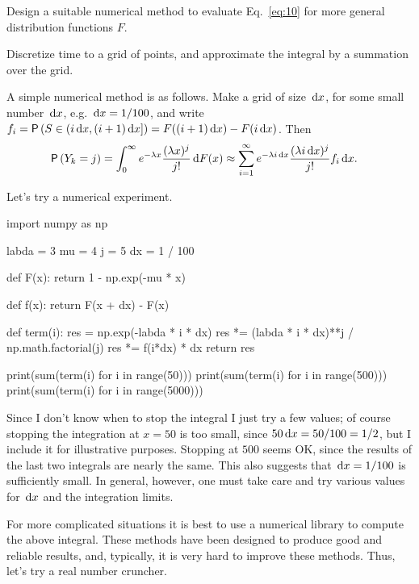 \begin{exercise}[\faPhoto] \label{ex:30} Design a suitable numerical method to evaluate   Eq.~\eqref{eq:10} for more 
  general distribution functions $F$.
\begin{hint}
Discretize time to  a grid of points, and   approximate the integral by a summation over the grid.
\end{hint}
  \begin{solution}
  A simple numerical method is as follows. Make a grid of
  size $\,\text{d}x$, for some small number $\,\text{d}x$, e.g. $\,\text{d}x=1/100$, and write
  $f_i = \P{S\in(i\d x, (i+1)\d x]} = F((i+1)\d x) - F(i\d x)$. Then 
  \begin{equation*}
    \begin{split}
  \P{Y_k = j} 
&= \int_0^\infty e^{-\lambda x}\frac{(\lambda x)^j}{j!} \d F(x) 
\approx \sum_{i=1}^\infty e^{-\lambda i \d x}\frac{(\lambda i\d x)^j}{j!} f_i \d x.
    \end{split}
\end{equation*}

Let's try a numerical experiment. 

\begin{pyconsole}
import numpy as np

labda = 3
mu = 4
j = 5
dx = 1 / 100


def F(x):
    return 1 - np.exp(-mu * x)


def f(x):
    return F(x + dx) - F(x)


def term(i):
    res = np.exp(-labda * i * dx)
    res *= (labda * i * dx)**j / np.math.factorial(j)
    res *= f(i*dx) * dx
    return res

\end{pyconsole}

\begin{pyconsole}
print(sum(term(i) for i in range(50)))
print(sum(term(i) for i in range(500)))
print(sum(term(i) for i in range(5000)))
\end{pyconsole}

Since I don't know when to stop the integral I just try a few values;
of course stopping the integration at $x=50$ is too small, since
$50\,\text{d}x=50/100=1/2$, but I include it for illustrative
purposes. Stopping at $500$ seems OK, since the results of the last
two integrals are nearly the same. This also suggests that
$\,\text{d}x=1/100$ is sufficiently small. In general, however, one must take
care and try various values for $\,\text{d}x$ and the integration limits.


For more complicated situations it is best to use a
numerical library to compute the above integral. These methods have been
designed to produce good and reliable results, and, typically, it is
very hard to improve these methods. Thus, let's try a real number
cruncher.


\end{solution}
\end{exercise}
